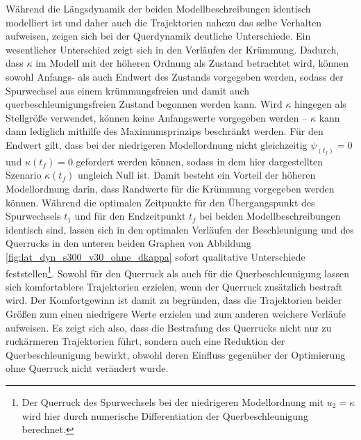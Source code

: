 Während die Längsdynamik der beiden Modellbeschreibungen identisch modelliert ist und daher auch die Trajektorien nahezu das selbe Verhalten aufweisen, zeigen sich bei der Querdynamik deutliche Unterschiede. Ein wesentlicher Unterschied zeigt sich in den Verläufen der Krümmung. Dadurch, dass $\kappa$ im Modell mit der höheren Ordnung als Zustand betrachtet wird, können sowohl Anfangs- als auch Endwert des Zustands vorgegeben werden, sodass der Spurwechsel aus einem krümmungsfreien und damit auch querbeschleunigungsfreien Zustand begonnen werden kann. Wird $\kappa$ hingegen als Stellgröße verwendet, können keine Anfangswerte vorgegeben werden -- $\kappa$ kann dann lediglich mithilfe des Maximumsprinzips beschränkt werden. Für den Endwert gilt, dass bei der niedrigeren Modellordnung nicht gleichzeitig $\psi_(t_f) = 0$ und $\kappa(t_f) = 0$ gefordert werden können, sodass in dem hier dargestellten Szenario $\kappa(t_f)$ ungleich Null ist. Damit besteht ein Vorteil der höheren Modellordnung darin, dass Randwerte für die Krümmung vorgegeben werden können. Während die optimalen Zeitpunkte für den Übergangspunkt des Spurwechsels $t_1$ und für den Endzeitpunkt $t_f$ bei beiden Modellbeschreibungen identisch sind, lassen sich in den optimalen Verläufen der Beschleunigung und des Querrucks in den unteren beiden Graphen von Abbildung \ref{fig:lat_dyn_s300_v30_ohne_dkappa} sofort qualitative Unterschiede feststellen\footnote{Der Querruck des Spurwechsels bei der niedrigeren Modellordnung mit $u_2 = \kappa$ wird hier durch numerische Differentiation der Querbeschleunigung berechnet.}. Sowohl für den Querruck als auch für die Querbeschleunigung lassen sich komfortablere Trajektorien erzielen, wenn der Querruck zusätzlich bestraft wird. Der Komfortgewinn ist damit zu begründen, dass die Trajektorien beider Größen zum einen niedrigere Werte erzielen und zum anderen weichere Verläufe aufweisen. Es zeigt sich also, dass die Bestrafung des Querrucks nicht nur zu ruckärmeren Trajektorien führt, sondern auch eine Reduktion der Querbeschleunigung bewirkt, obwohl deren Einfluss gegenüber der Optimierung ohne Querruck nicht verändert wurde.


